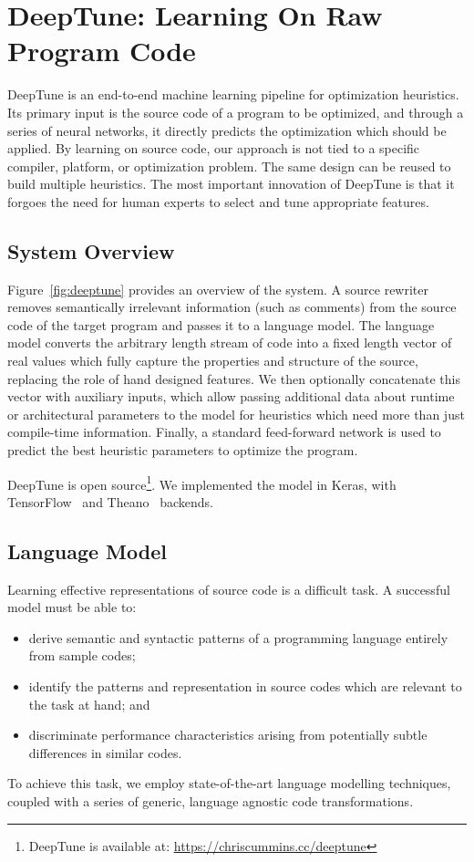 \section{DeepTune: Learning On Raw Program Code} \label{sec:DeepTune}



DeepTune is an end-to-end machine learning pipeline for optimization heuristics. Its primary input is the source code of a program to be optimized, and through a series of neural networks, it directly predicts the optimization which should be applied. By learning on source code, our approach is not tied to a specific compiler, platform, or optimization problem. The same design can be reused to build multiple heuristics. The most important innovation of DeepTune is that it forgoes the need for human experts to select and tune appropriate features.


\subsection{System Overview}

Figure~\ref{fig:deeptune} provides an overview of the system. A source rewriter removes semantically irrelevant information (such as comments) from the source code of the target program and passes it to a language model. The language model converts the arbitrary length stream of code into a fixed length vector of real values which fully capture the properties and structure of the source, replacing the role of hand designed features. We then optionally concatenate this vector with auxiliary inputs, which allow passing additional data about runtime or architectural parameters to the model for heuristics which need more than just compile-time information. Finally, a standard feed-forward network is used to predict the best heuristic parameters to optimize the program.

DeepTune is open source\footnote{DeepTune is available at: \url{https://chriscummins.cc/deeptune}}. We implemented the model in Keras, with TensorFlow~\cite{Abadi} and Theano~\cite{Bergstra2011} backends.


\subsection{Language Model}

Learning effective representations of source code is a difficult task. A successful model must be able to:
%
\begin{itemize}
  \item derive semantic and syntactic patterns of a programming language entirely from sample codes;
  \item identify the patterns and representation in source codes which are relevant to the task at hand; and
  \item discriminate performance characteristics arising from potentially subtle differences in similar codes.
\end{itemize}
%
To achieve this task, we employ state-of-the-art language modelling techniques, coupled with a series of generic, language agnostic code transformations.

